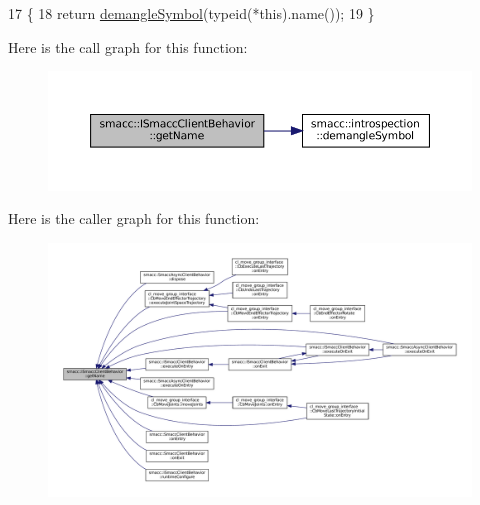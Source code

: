 \begin{DoxyCode}
17     \{
18         \textcolor{keywordflow}{return} \hyperlink{namespacesmacc_1_1introspection_a2f495108db3e57604d8d3ff5ef030302}{demangleSymbol}(\textcolor{keyword}{typeid}(*this).name());
19     \}
\end{DoxyCode}
Here is the call graph for this function\+:
\nopagebreak
\begin{figure}[H]
\begin{center}
\leavevmode
\includegraphics[width=350pt]{classsmacc_1_1ISmaccClientBehavior_a18e4bec9460b010f2894c0f7e7064a34_cgraph}
\end{center}
\end{figure}
Here is the caller graph for this function\+:
\nopagebreak
\begin{figure}[H]
\begin{center}
\leavevmode
\includegraphics[width=350pt]{classsmacc_1_1ISmaccClientBehavior_a18e4bec9460b010f2894c0f7e7064a34_icgraph}
\end{center}
\end{figure}
\mbox{\label{classsmacc_1_1ISmaccClientBehavior_a9d55a85bf0a920033805a3c050de2019}} 
